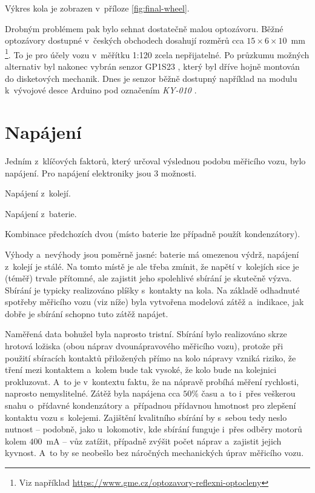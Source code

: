 Výkres kola je zobrazen v~příloze \ref{fig:final-wheel}.

Drobným problémem pak bylo sehnat dostatečně malou optozávoru. Běžné optozávory
dostupné v~českých obchodech dosahují rozměrů cca $15\times6\times10$~mm
\footnote{Viz například
\url{https://www.gme.cz/optozavory-reflexni-optocleny}}. To je pro účely vozu
v~měřítku 1:120 zcela nepřijatelné. Po
průzkumu možných alternativ byl nakonec vybrán senzor
GP1S23 \cite{gp1s23:datasheet}, který byl dříve hojně montován do disketových
mechanik. Dnes je senzor běžně dostupný například na modulu k~vývojové desce
Arduino pod označením \textit{KY-010} \cite{ky-010}.

\section{Napájení}
\label{sec:wsm-napajeni}

Jedním z~klíčových faktorů, který určoval výslednou podobu měřicího vozu, bylo
napájení. Pro napájení elektroniky jsou 3 možnosti.

\begin{compactenum}
\item Napájení z~kolejí.
\item Napájení z~baterie.
\item Kombinace předchozích dvou (místo baterie lze případně použít kondenzátory).
\end{compactenum}

Výhody a~nevýhody jsou poměrně jasné: baterie má omezenou výdrž, napájení
z~kolejí je stálé. Na tomto místě je ale třeba zmínit, že napětí v~kolejích
sice je (téměř) trvale přítomné, ale zajistit jeho spolehlivé sbírání je
skutečně výzva. Sbírání je typicky realizováno plíšky s~kontakty na kola.
Na základě odhadnuté spotřeby měřicího vozu (viz níže) byla vytvořena modelová
zátěž a~indikace, jak dobře je sbírání schopno tuto zátěž napájet.

Naměřená data bohužel byla naprosto tristní. Sbírání bylo realizováno skrze
hrotová ložiska (obou náprav dvounápravového měřicího vozu), protože při použití
sbíracích kontaktů přiložených přímo na kolo nápravy vzniká riziko, že tření mezi
kontaktem a~kolem bude tak vysoké, že kolo bude na kolejnici prokluzovat. A~to
je v~kontextu faktu, že na nápravě probíhá měření rychlosti, naprosto
nemyslitelné. Zátěž byla napájena cca $50 \%$ času a~to i~přes veškerou snahu
o~přídavné kondenzátory a~případnou přídavnou hmotnost pro zlepšení kontaktu
vozu s~kolejemi. Zajištění kvalitního sbírání by s~sebou tedy neslo nutnost --
podobně, jako u~lokomotiv, kde sbírání funguje i~přes odběry motorů kolem
$400$~mA -- vůz zatížit, případně zvýšit počet náprav a~zajistit jejich
kyvnost. A~to by se neobešlo bez náročných mechanických úprav měřicího vozu.

